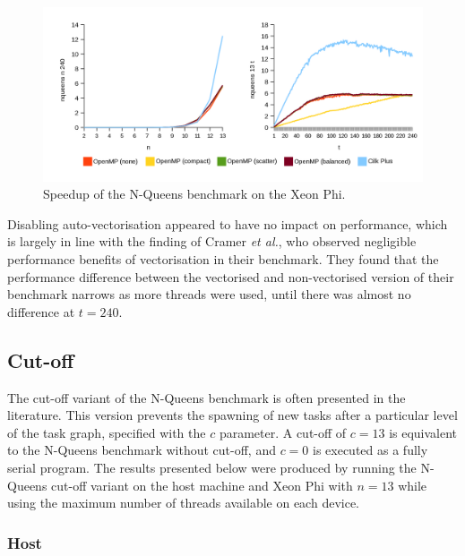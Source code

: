 \documentclass{report}
\begin{document}
\noindent
\begin{figure}[t!]
	\includegraphics[width=\linewidth]{../../charts/mic/nqueens_speedup}
	\caption{Speedup of the N-Queens benchmark on the Xeon Phi.}
	\label{Fig:nqueensmicspeedup}
\end{figure}

Disabling auto-vectorisation appeared to have no impact on performance, which is largely in line with the finding of Cramer \textit{et al.}\cite{Cramer12}, who observed negligible performance benefits of vectorisation in their benchmark. They found that the performance difference between the vectorised and non-vectorised version of their benchmark narrows as more threads were used, until there was almost no difference at \(t=240\).

\subsection{Cut-off} \label{Sec:evalnqueenscutoff}

The cut-off variant of the N-Queens benchmark is often presented in the literature. This version prevents the spawning of new tasks after a particular level of the task graph, specified with the \(c\) parameter. A cut-off of \(c=13\) is equivalent to the N-Queens benchmark without cut-off, and \(c=0\) is executed as a fully serial program. The results presented below were produced by running the N-Queens cut-off variant on the host machine and Xeon Phi with \(n=13\) while using the maximum number of threads available on each device.

\subsubsection{Host}
\end{document}
